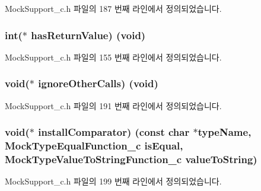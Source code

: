 Mock\+Support\+\_\+c.\+h 파일의 187 번째 라인에서 정의되었습니다.

\subsubsection[{\texorpdfstring{has\+Return\+Value}{hasReturnValue}}]{\setlength{\rightskip}{0pt plus 5cm}int($\ast$ has\+Return\+Value) (void)}\hypertarget{struct_s_mock_support__c_abf2a8673b027d72522a797f0a1c11cf4}{}\label{struct_s_mock_support__c_abf2a8673b027d72522a797f0a1c11cf4}


Mock\+Support\+\_\+c.\+h 파일의 155 번째 라인에서 정의되었습니다.

\subsubsection[{\texorpdfstring{ignore\+Other\+Calls}{ignoreOtherCalls}}]{\setlength{\rightskip}{0pt plus 5cm}void($\ast$ ignore\+Other\+Calls) (void)}\hypertarget{struct_s_mock_support__c_aa10fe8196c2979f976aae1034c938f28}{}\label{struct_s_mock_support__c_aa10fe8196c2979f976aae1034c938f28}


Mock\+Support\+\_\+c.\+h 파일의 191 번째 라인에서 정의되었습니다.

\subsubsection[{\texorpdfstring{install\+Comparator}{installComparator}}]{\setlength{\rightskip}{0pt plus 5cm}void($\ast$ install\+Comparator) (const char $\ast$type\+Name, {\bf Mock\+Type\+Equal\+Function\+\_\+c} is\+Equal, {\bf Mock\+Type\+Value\+To\+String\+Function\+\_\+c} value\+To\+String)}\hypertarget{struct_s_mock_support__c_a6febf7134cf53d8b30ee0ad7bab39b8e}{}\label{struct_s_mock_support__c_a6febf7134cf53d8b30ee0ad7bab39b8e}


Mock\+Support\+\_\+c.\+h 파일의 199 번째 라인에서 정의되었습니다.

